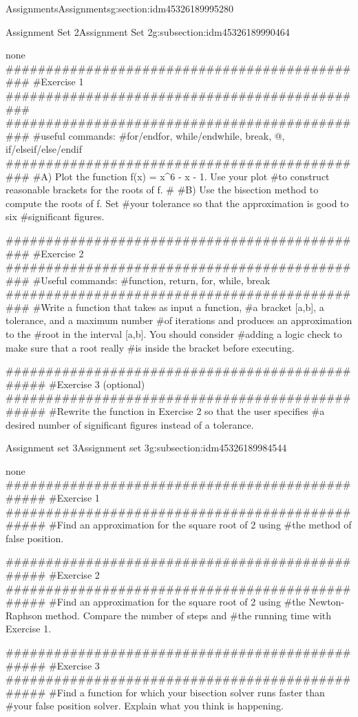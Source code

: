 \documentclass[oneside,10pt,]{article}
\numberwithin{equation}{section}
\numberwithin{equation}{section}
\begin{document}
\begin{sectionptx}{Assignments}{}{Assignments}{}{}{g:section:idm45326189995280}
\begin{subsectionptx}{Assignment Set 2}{}{Assignment Set 2}{}{}{g:subsection:idm45326189990464}
\begin{program}{none}
##############################################
#Exercise 1
##############################################
##############################################
#useful commands:
#for/endfor, while/endwhile, break, @, if/elseif/else/endif
##############################################
#A) Plot the function f(x) = x^6 - x - 1. Use your plot
#to construct reasonable brackets for the roots of f.
#
#B) Use the bisection method to compute the roots of f. Set
#your tolerance so that the approximation is good to six
#significant figures.






##############################################
#Exercise 2
##############################################
#Useful commands:
#function, return, for, while, break
##############################################
#Write a function that takes as input a function,
#a bracket [a,b], a tolerance, and a maximum number
#of iterations and produces an approximation to the
#root in the interval [a,b]. You should consider
#adding a logic check to make sure that a root really
#is inside the bracket before executing.




################################################
#Exercise 3 (optional)
################################################
#Rewrite the function in Exercise 2 so that the user specifies
#a desired number of significant figures instead of a tolerance.
\end{program}
\end{subsectionptx}
%
%
\typeout{************************************************}
\typeout{************************************************}
%
\begin{subsectionptx}{Assignment set 3}{}{Assignment set 3}{}{}{g:subsection:idm45326189984544}
\begin{program}{none}
################################################
#Exercise 1
################################################
#Find an approximation for the square root of 2 using
#the method of false position.


################################################
#Exercise 2
################################################
#Find an approximation for the square root of 2 using
#the Newton-Raphson method. Compare the number of steps and
#the running time with Exercise 1.

################################################
#Exercise 3
################################################
#Find a function for which your bisection solver runs faster than
#your false position solver. Explain what you think is happening.


\end{program}
\end{subsectionptx}
\end{sectionptx}
\end{document}
